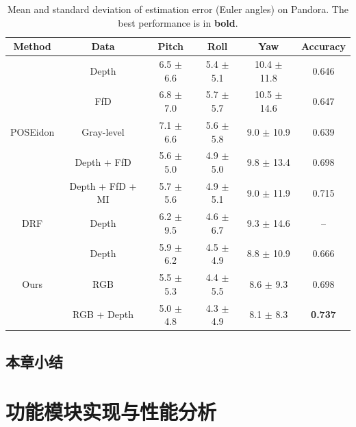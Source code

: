 \documentclass[supercite]{Experimental_Report}
\theoremstyle{definition}
\begin{document}
\begin{table}
	\begin{center}
		\setlength{\tabcolsep}{3.0mm}
		\caption{Mean and standard deviation of estimation error (Euler angles) on Pandora. The best performance is in \textbf{bold}.}
		\label{table2}
		\begin{tabular}{c|ccccc}
			\hline
			Method    			        & Data               & Pitch         & Roll           & Yaw              & Accuracy\\
			\hline
			\hline			
			\multirow{5}{*}{POSEidon}   & Depth              & 6.5 $\pm$ 6.6  & 5.4 $\pm$ 5.1  & 10.4 $\pm$ 11.8  & 0.646\\
			                            & FfD              	 & 6.8 $\pm$ 7.0  & 5.7 $\pm$ 5.7  & 10.5 $\pm$ 14.6  & 0.647\\
			                            & Gray-level         & 7.1 $\pm$ 6.6  & 5.6 $\pm$ 5.8  & 9.0  $\pm$ 10.9  & 0.639\\
			                            & Depth + FfD	     & 5.6 $\pm$ 5.0  & 4.9 $\pm$ 5.0  & 9.8  $\pm$ 13.4  & 0.698\\
		 	                            & Depth + FfD + MI   & 5.7 $\pm$ 5.6  & 4.9 $\pm$ 5.1  & 9.0  $\pm$ 11.9  & 0.715\\
			\hline
			DRF                         & Depth              & 6.2 $\pm$ 9.5  & 4.6 $\pm$ 6.7  & 9.3  $\pm$ 14.6  & --\\
			\hline
			\multirow{3}{*}{Ours}   	& Depth              & 5.9 $\pm$ 6.2  & 4.5 $\pm$ 4.9  & 8.8  $\pm$ 10.9  & 0.666\\
			                            & RGB                & 5.5 $\pm$ 5.3  & 4.4 $\pm$ 5.5  & 8.6  $\pm$ 9.3   & 0.698\\
			                            & RGB + Depth        & 5.0 $\pm$ 4.8  & 4.3 $\pm$ 4.9  & 8.1  $\pm$ 8.3   & \textbf{0.737}\\
			\hline
		\end{tabular}
	\end{center}
\end{table}

\subsection{本章小结}

\newpage

\section{功能模块实现与性能分析}
\end{document}
